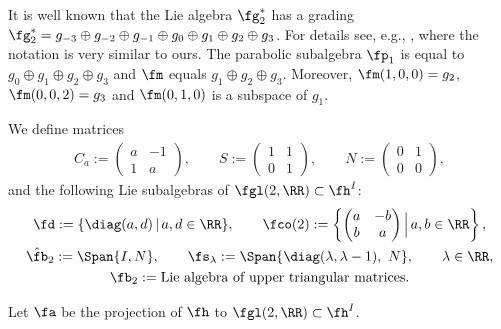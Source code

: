 \begin{Remark}
It is well known that the Lie algebra $\fg_2^*$ has a grading $\fg_2^*=g_{-3}\oplus g_{-2}\oplus g_{-1}\oplus g_0 \oplus g_{1}\oplus g_2\oplus g_3$. For details see, e.g., \cite[p.~14]{HS}, where the notation is very similar to ours. The parabolic subalgebra $\fp_1$ is equal to $g_0 \oplus g_{1}\oplus g_2\oplus g_3$ and $\fm$ equals $g_{1}\oplus g_2\oplus g_3$. Moreover, $\fm(1,0,0)=g_2$, $\fm(0,0,2)=g_3$ and $\fm(0,1,0)$ is a subspace of $g_1$.
\end{Remark}

We define matrices
\begin{gather*}C_a:=\left(\begin{matrix} a&-1\\1&a\end{matrix}\right),\qquad S:=\left(\begin{matrix} 1&1\\0&1\end{matrix}\right),\qquad N:=\left(\begin{matrix} 0&1\\0&0\end{matrix}\right),
\end{gather*}
and the following Lie subalgebras of $\fgl(2,\RR)\subset \fh^I$:
\begin{gather*}
\fd := \{\diag(a,d)\,|\, a,d\in\RR\},\qquad
\fco(2) := \left\{ \left(\begin{matrix} a&-b\\b&a\end{matrix}\right) \Big| \, a,b\in\RR\right\},\\
\hat\fb_2 := \Span\{ I,N\},\qquad
\fs_\lambda := \Span \{\diag(\lambda, \lambda-1),\ N\},\qquad \lambda\in\RR,\\
\fb_2 := \text{Lie algebra of upper triangular matrices}.
\end{gather*}

Let $\fa$ be the projection of $\fh$ to $\fgl(2,\RR)\subset \fh^I$.

